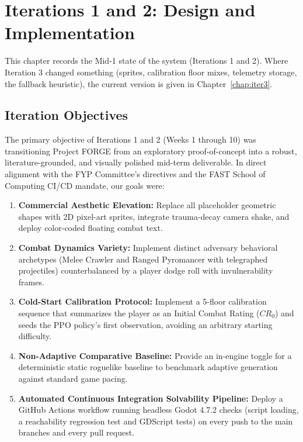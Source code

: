 \chapter{Iterations 1 and 2: Design and Implementation}
\label{chap:iter1}

This chapter records the Mid-1 state of the system (Iterations 1 and 2). Where Iteration 3 changed something (sprites, calibration floor mixes, telemetry storage, the fallback heuristic), the current version is given in Chapter~\ref{chap:iter3}.

\section{Iteration Objectives}
The primary objective of Iterations 1 and 2 (Weeks 1 through 10) was transitioning Project FORGE from an exploratory proof-of-concept into a robust, literature-grounded, and visually polished mid-term deliverable. In direct alignment with the FYP Committee's directives and the FAST School of Computing CI/CD mandate, our goals were:
\begin{enumerate}
    \item \textbf{Commercial Aesthetic Elevation:} Replace all placeholder geometric shapes with 2D pixel-art sprites, integrate trauma-decay camera shake, and deploy color-coded floating combat text.
    \item \textbf{Combat Dynamics Variety:} Implement distinct adversary behavioral archetypes (Melee Crawler and Ranged Pyromancer with telegraphed projectiles) counterbalanced by a player dodge roll with invulnerability frames.
    \item \textbf{Cold-Start Calibration Protocol:} Implement a 5-floor calibration sequence that summarizes the player as an Initial Combat Rating ($CR_0$) and seeds the PPO policy's first observation, avoiding an arbitrary starting difficulty.
    \item \textbf{Non-Adaptive Comparative Baseline:} Provide an in-engine toggle for a deterministic static roguelike baseline to benchmark adaptive generation against standard game pacing.
    \item \textbf{Automated Continuous Integration Solvability Pipeline:} Deploy a GitHub Actions workflow running headless Godot 4.7.2 checks (script loading, a reachability regression test and GDScript tests) on every push to the main branches and every pull request.
\end{enumerate}

